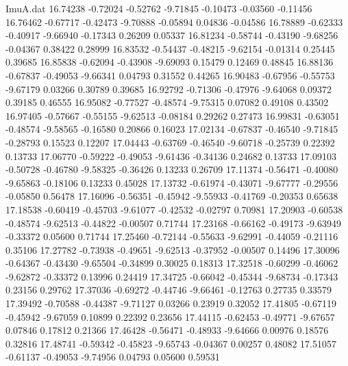 \begin{filecontents}{ImuA.dat}
  16.74238   -0.72024   -0.52762   -9.71845   -0.10473   -0.03560   -0.11456
  16.76462   -0.67717   -0.42473   -9.70888   -0.05894    0.04836   -0.04586
  16.78889   -0.62333   -0.40917   -9.66940   -0.17343    0.26209    0.05337
  16.81234   -0.58744   -0.43190   -9.68256   -0.04367    0.38422    0.28999
  16.83532   -0.54437   -0.48215   -9.62154   -0.01314    0.25445    0.39685
  16.85838   -0.62094   -0.43908   -9.69093    0.15479    0.12469    0.48845
  16.88136   -0.67837   -0.49053   -9.66341    0.04793    0.31552    0.44265
  16.90483   -0.67956   -0.55753   -9.67179    0.03266    0.30789    0.39685
  16.92792   -0.71306   -0.47976   -9.64068    0.09372    0.39185    0.46555
  16.95082   -0.77527   -0.48574   -9.75315    0.07082    0.49108    0.43502
  16.97405   -0.57667   -0.55155   -9.62513   -0.08184    0.29262    0.27473
  16.99831   -0.63051   -0.48574   -9.58565   -0.16580    0.20866    0.16023
  17.02134   -0.67837   -0.46540   -9.71845   -0.28793    0.15523    0.12207
  17.04443   -0.63769   -0.46540   -9.60718   -0.25739    0.22392    0.13733
  17.06770   -0.59222   -0.49053   -9.61436   -0.34136    0.24682    0.13733
  17.09103   -0.50728   -0.46780   -9.58325   -0.36426    0.13233    0.26709
  17.11374   -0.56471   -0.40080   -9.65863   -0.18106    0.13233    0.45028
  17.13732   -0.61974   -0.43071   -9.67777   -0.29556   -0.05850    0.56478
  17.16096   -0.56351   -0.45942   -9.55933   -0.41769   -0.20353    0.65638
  17.18538   -0.60419   -0.45703   -9.61077   -0.42532   -0.02797    0.70981
  17.20903   -0.60538   -0.48574   -9.62513   -0.44822   -0.00507    0.71744
  17.23168   -0.66162   -0.49173   -9.63949   -0.33372    0.05600    0.71744
  17.25460   -0.72144   -0.55633   -9.62991   -0.44059   -0.21116    0.35106
  17.27782   -0.73938   -0.49651   -9.62513   -0.37952   -0.00507    0.14496
  17.30096   -0.64367   -0.43430   -9.65504   -0.34899    0.30025    0.18313
  17.32518   -0.60299   -0.46062   -9.62872   -0.33372    0.13996    0.24419
  17.34725   -0.66042   -0.45344   -9.68734   -0.17343    0.23156    0.29762
  17.37036   -0.69272   -0.44746   -9.66461   -0.12763    0.27735    0.33579
  17.39492   -0.70588   -0.44387   -9.71127    0.03266    0.23919    0.32052
  17.41805   -0.67119   -0.45942   -9.67059    0.10899    0.22392    0.23656
  17.44115   -0.62453   -0.49771   -9.67657    0.07846    0.17812    0.21366
  17.46428   -0.56471   -0.48933   -9.64666    0.00976    0.18576    0.32816
  17.48741   -0.59342   -0.45823   -9.65743   -0.04367    0.00257    0.48082
  17.51057   -0.61137   -0.49053   -9.74956    0.04793    0.05600    0.59531

\end{filecontents}
